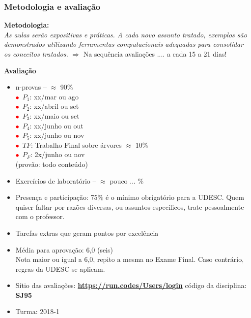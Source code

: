 \begin{frame}[allowframebreaks=0.9]

\frametitle{Metodologia e avaliação}

\textbf{Metodologia:} \\

\textit{As aulas serão expositivas e práticas. A cada novo assunto tratado, exemplos  são demonstrados utilizando ferramentas computacionais adequadas
  para consolidar os conceitos 
 tratados.
 }
 \pause
 $\Rightarrow  $ Na sequ\^encia avaliaç\~oes .... a cada 15 a 21 dias!

\newpage
    \textbf{Avaliação}

    \begin{itemize}
    \item n-provas -- $\approx$  90\%\\
      
	\quad \textcolor{red}{$\bullet$}~$P_1$: xx/mar ou ago\\
	\quad \textcolor{red}{$\bullet$}~$P_2$: xx/abril ou set\\
		\quad \textcolor{red}{$\bullet$}~$P_3$: xx/maio ou set\\
	\quad \textcolor{red}{$\bullet$}~$P_4$: xx/junho ou out\\
		\quad \textcolor{red}{$\bullet$}~$P_5$: xx/junho ou nov\\
		\quad \textcolor{red}{$\bullet$}~$TF$: Trabalho Final sobre \'arvores $\approx$  10\%\\
	\quad \textcolor{red}{$\bullet$}~$P_F$: 2x/junho ou nov\\(provão: todo conteúdo)

      \item Exercícios de laboratório  -- $\approx $ pouco ... \%
             
      \item Presença e participação: 75\% é o mínimo obrigatório
      para a UDESC. Quem quiser faltar por razões diversas,
       ou assuntos específicos, trate pessoalmente com o professor.
        
      \item Tarefas extras que geram pontos por excelência 
      
      \item Média para aprovação: 6,0 (seis)\\
      Nota maior ou igual a 6,0, repito a mesma no Exame Final. 
      Caso contrário, regras da UDESC se aplicam.
      
      
      \item Sítio das avaliações: \textbf{\url{https://run.codes/Users/login}}   código da disciplina: \textbf{SJ95}
      \item Turma: 2018-1
      
    \end{itemize}

\end{frame}



